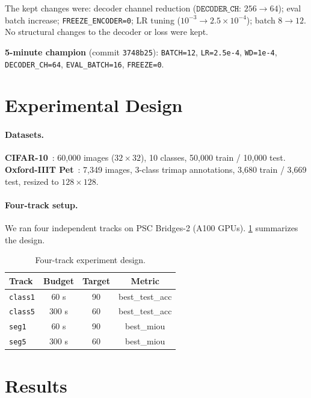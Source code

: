 \documentclass[10pt,twocolumn,letterpaper]{article}
\begin{document}
The kept changes were: decoder channel reduction
($\texttt{DECODER\_CH}$: $256\to64$); eval batch increase;
\texttt{FREEZE\_ENCODER=0}; LR tuning ($10^{-3}\to2.5\times10^{-4}$);
batch $8\to12$.
No structural changes to the decoder or loss were kept.

\textbf{5-minute champion} (commit \texttt{3748b25}):
\texttt{BATCH=12}, \texttt{LR=2.5e-4}, \texttt{WD=1e-4},
\texttt{DECODER\_CH=64}, \texttt{EVAL\_BATCH=16},
\texttt{FREEZE=0}.

\section{Experimental Design}

\paragraph{Datasets.}
\textbf{CIFAR-10}~\cite{krizhevsky2009learning}: 60{,}000 images
($32\times32$), 10 classes, 50{,}000 train / 10{,}000 test.
\textbf{Oxford-IIIT Pet}~\cite{parkhi2012cats}: 7{,}349 images,
3-class trimap annotations, 3{,}680 train / 3{,}669 test,
resized to $128\times128$.

\paragraph{Four-track setup.}
We ran four independent tracks on PSC Bridges-2 (A100 GPUs).
\cref{tab:tracks} summarizes the design.

\begin{table}[t]
  \centering
  \caption{Four-track experiment design.}
  \label{tab:tracks}
  \small
  \begin{tabular}{lccc}
    \toprule
    Track & Budget & Target & Metric \\
    \midrule
    \texttt{class1} & 60 s  & 90 & best\_test\_acc \\
    \texttt{class5} & 300 s & 60 & best\_test\_acc \\
    \texttt{seg1}   & 60 s  & 90 & best\_miou \\
    \texttt{seg5}   & 300 s & 60 & best\_miou \\
    \bottomrule
  \end{tabular}
\end{table}

\section{Results}
\end{document}
